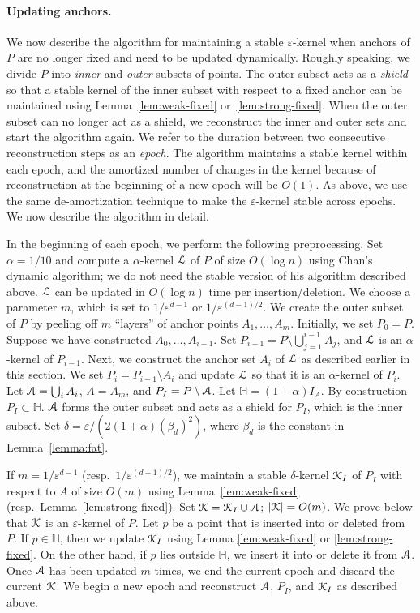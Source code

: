 \documentclass[11pt]{myclass}
\newcommand{\eps}{\varepsilon}
\def\hcube{\mathbb{H}}
\def\A{\EuScript{A}}
\def\kernel{\EuScript{K}}
\def\wkernel{\EuScript{L}}
\begin{document}
\paragraph{Updating anchors.}

We now describe the algorithm for maintaining a stable $\eps$-kernel when
anchors of $P$ are no longer fixed and need to be updated dynamically. 
Roughly speaking,
we divide $P$ into \emph{inner} and \emph{outer} subsets of points. 
The outer subset acts as a \emph{shield} so that a stable kernel of the inner
subset with respect to a fixed anchor can be maintained using 
Lemma~\ref{lem:weak-fixed} or~\ref{lem:strong-fixed}. When the 
outer subset can no longer act as a shield, we reconstruct the inner
and outer sets and start the algorithm again. We refer to the duration 
between two consecutive reconstruction steps as an \emph{epoch}. 
The algorithm maintains a stable kernel within each epoch, and 
the amortized number of changes in the kernel because of 
reconstruction at the beginning of a new epoch will be $O(1)$. As above, we 
use the same de-amortization technique to make the $\eps$-kernel stable
across epochs. We now describe the algorithm in detail.

In the beginning of each epoch, we perform the following preprocessing.
Set $\alpha=1/10$ and compute a $\alpha$-kernel $\wkernel$ of $P$ 
of size $O(\log n)$ using Chan's dynamic algorithm; we do not need the stable 
version of his algorithm described above.  $\wkernel$ can be updated
in $O(\log n)$ time per insertion/deletion.
We choose a parameter $m$, which is set to $1/\eps^{d-1}$ or 
$1/\eps^{(d-1)/2}$. We create the outer subset of $P$ by peeling off 
$m$ ``layers'' of anchor points $A_1, \ldots, A_m$.
Initially, we set $P_0 = P$. Suppose we have constructed 
$A_0,\ldots,A_{i-1}$. Set $P_{i-1}=P \setminus \bigcup_{j=1}^{i-1} A_j$,
and $\wkernel$ is an $\alpha$-kernel of $P_{i-1}$.
Next, we construct the anchor set $A_i$ of $\wkernel$ 
as described earlier in this section. We set $P_i = P_{i-1}\setminus A_i$
and update $\wkernel$ so that it is an $\alpha$-kernel of $P_i$. Let 
$\A = \bigcup_i A_i$, $A = A_m$, and $P_I = P \setminus \A$. Let
$\hcube= (1+\alpha)I_A$. By construction $P_I \subset \hcube$.  $\A$ forms the outer subset and acts as a shield for $P_I$, which is the inner subset. 
Set $\delta = \eps/(2(1+\alpha)(\beta_d)^2)$, where $\beta_d$ is the constant in Lemma~\ref{lemma:fat}.

If $m=1/\eps^{d-1}$ (resp.\ $1/\eps^{(d-1)/2}$), we maintain a stable
$\delta$-kernel $\kernel_I$ of $P_I$ with respect to $A$ of size $O(m)$
using Lemma~\ref{lem:weak-fixed} (resp.\ Lemma~\ref{lem:strong-fixed}).
Set 
$\kernel = \kernel_I \cup \A$; $|\kernel|=O(m)$. We prove below that $\kernel$ is an 
$\eps$-kernel of $P$.
Let $p$ be a point that is inserted into or deleted from $P$.
If $p \in \hcube$, then we update  $\kernel_I$ using 
Lemma \ref{lem:weak-fixed} or \ref{lem:strong-fixed}.  On the other hand,
if $p$ lies outside $\hcube$, we insert it into or delete it from $\A$.
Once $\A$ has been updated $m$ times, we end the current epoch and discard the 
current $\kernel$. We begin a new epoch and reconstruct
$\A$, $P_I$, and $\kernel_I$ as described above. 
\end{document}
